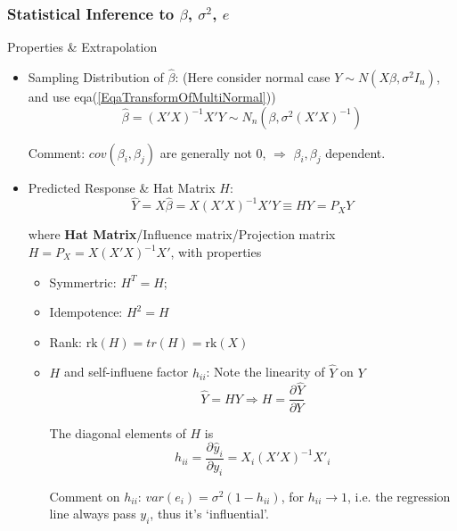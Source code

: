 \subsubsection{Statistical Inference to $ \beta  $, $ \sigma ^2 $, $ e $}\label{SubSubSectionStatisticalInferenceInMultiLRA}
    Properties \& Extrapolation
\begin{itemize}[topsep=2pt,itemsep=2pt]
    \item Sampling Distribution of $ \hat{\beta } $: (Here consider normal case $ Y\sim N(X\beta ,\sigma^2I_n) $, and use eqa(\ref{EqaTransformOfMultiNormal})) 
    \begin{equation}\label{EqaDistributionOfMultiVariateBeta}
        \hat{\beta }=(X'X)^{-1}X'Y \sim N_n(\beta,\sigma^2(X'X)^{-1})
    \end{equation}

    Comment: $ cov(\beta_i,\beta_j ) $ are generally not 0, $ \Rightarrow $ $ \beta _i,\beta _j $ dependent.
    \item Predicted Response \& Hat Matrix $ H $:
    \begin{equation}
        \hat{Y}=X\hat{\beta }=X(X'X)^{-1}X'Y\equiv  HY=P_XY
    \end{equation}

    where \textbf{Hat Matrix}/Influence matrix/Projection matrix $ H=P_X=X(X'X)^{-1}X' $, with properties
    \begin{itemize}[topsep=2pt,itemsep=2pt]
        \item Symmertric: $ H^T=H $;
        \item Idempotence: $ H^2=H $
        \item Rank: $ \mathrm{rk}(H)=tr(H)=\mathrm{rk}(X)   $
        \item $ H $ and self-influene factor $ h_{ii} $: Note the linearity of $ \hat{Y} $ on $ Y $
        \begin{equation}
            \hat{Y}=HY \Rightarrow H=\dfrac{\partial^{} \hat{Y}}{\partial Y^{}}
        \end{equation} 
    
        The diagonal elements of $ H $ is 
        \begin{equation}
            h_{ii}=\dfrac{\partial^{}\hat{y}_i}{\partial y_i^{}}=X_i(X'X)^{-1}X'_i
        \end{equation}

        Comment on $ h_{ii} $: $ var(e_i) =\sigma ^2(1-h_{ii})$, for $ h_{ii}\to 1 $, i.e. the regression line always pass $ y_i $, thus it's `influential'.
    \end{itemize}


\end{itemize}
